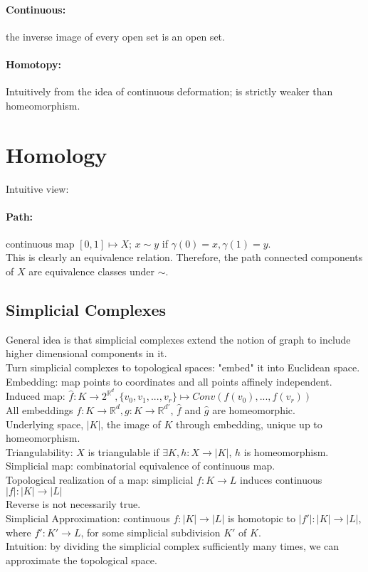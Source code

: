 \documentclass[10pt,a4paper]{article}
\begin{document}
\paragraph{Continuous:}the inverse image of every open set is an open set.

\paragraph{Homotopy:}
Intuitively from the idea of continuous deformation; is strictly weaker than homeomorphism.

\section{Homology}
Intuitive view:\\
\paragraph{Path:} continuous map $[0,1]\mapsto X$; $x\sim y$ if $\gamma(0)=x,\gamma(1)=y$.\\
This is clearly an equivalence relation. Therefore, the path connected components of $X$ are equivalence classes under $\sim$.
\subsection{Simplicial Complexes}
General idea is that simplicial complexes extend the notion of graph to include higher dimensional components in it.\\
Turn simplicial complexes to topological spaces: "embed" it into Euclidean space.\\
Embedding: map points to coordinates and all points affinely independent.\\
Induced map: $\hat{f}:K\to 2^{\mathbb{R}^d},\{ v_0,v_1,...,v_r\}\mapsto Conv(f(v_0),...,f(v_r))$\\
All embeddings $f:K\to\mathbb{R}^d,g:K\to\mathbb{R}^{d'}$, $\hat{f}$ and $\hat{g}$ are homeomorphic.\\
Underlying space, $|K|$, the image of $K$ through embedding, unique up to homeomorphism.\\
Triangulability: $X$ is triangulable if $\exists K,h:X\to|K|$, $h$ is homeomorphism.\\
Simplicial map: combinatorial equivalence of continuous map.\\
Topological realization of a map: simplicial $f:K\to L$ induces continuous $|f|:|K|\to|L|$\\
Reverse is not necessarily true.\\
Simplicial Approximation: continuous $f:|K|\to|L|$ is homotopic to $|f'|:|K|\to|L|$, where $f':K'\to L$, for some simplicial subdivision $K'$ of $K$.\\
Intuition: by dividing the simplicial complex sufficiently many times, we can approximate the topological space.
\end{document}
